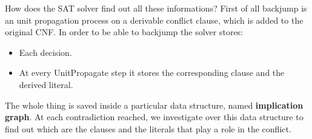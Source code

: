 How does the SAT solver find out all these informations? First of all backjump is an unit propagation process on a derivable conflict clause, which is 
added to the original CNF. In order to be able to backjump the solver stores:
\begin{itemize}
    \renewcommand{\labelitemi}{-}
    \item Each decision.
    \item At every UnitPropagate step it stores the corresponding clause and the derived literal.
\end{itemize}
The whole thing is saved inside a particular data structure, named \textbf{implication graph}. At each contradiction reached, we investigate over this 
data structure to find out which are the clauses and the literals that play a role in the conflict.